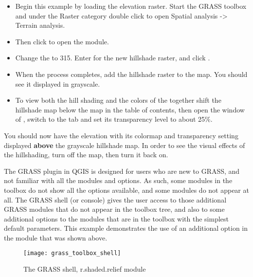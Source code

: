 \begin{itemize}
\item Begin this example by loading the  elevation raster.
Start the GRASS toolbox and under the Raster category double click to open Spatial
analysis -> Terrain analysis. 
\item Then click  to open
the module. 
\item Change the  to 315. Enter
 for the  new hillshade raster, and click . 
\item When the process completes, add the hillshade raster to the map. You
should see it displayed in grayscale. 
\item To view both the hill shading and the colors of the
 together shift the hillshade map below the
 map in the table of contents, then open the
 window of , switch to the
 tab and set its transparency level to about 25\%. 
\end{itemize}

You should now have the  elevation with its colormap and
transparency setting displayed \textbf{above} the grayscale hillshade map. In
order to see the visual effects of the hillshading, turn off the
 map, then turn it back on.

 
The GRASS plugin in QGIS is designed for users who are new to GRASS, and not
familiar with all the modules and options. As such, some modules in the
toolbox do not show all the options available, and some modules do not appear
at all. The GRASS shell (or console) gives the user access to those
additional GRASS modules that do not appear in the toolbox tree, and also to
some additional options to the modules that are in the toolbox with the
simplest default parameters. This example demonstrates the use of an
additional option in the  module that was shown
above.

\begin{figure}[ht]
 \begin{center}
 \caption{The GRASS shell, r.shaded.relief module \nixcaption}\label{fig:grass_toolbox_shell}
 \texttt{[image: grass\_toolbox\_shell]}
 \end{center}
\end{figure}


